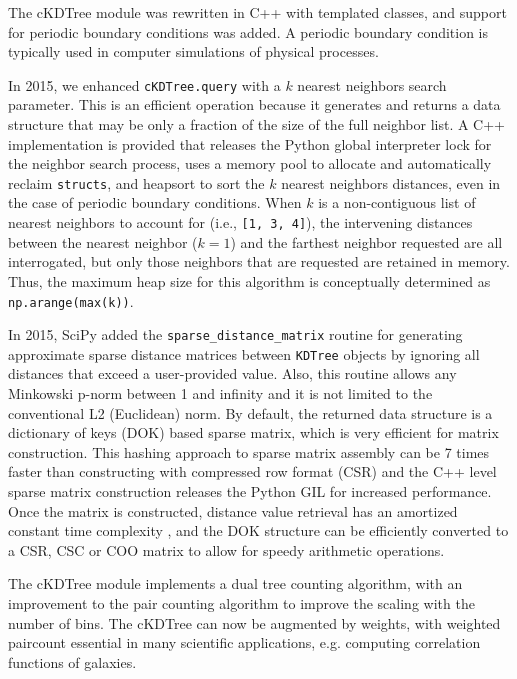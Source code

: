 The cKDTree module was rewritten in C++ with templated classes, and support for
periodic boundary conditions was added. A periodic boundary condition is typically 
used in computer simulations of physical processes.

In 2015, we enhanced \texttt{cKDTree.query} with a $k$ nearest neighbors search
parameter. This is an efficient operation\cite{Sproull:1991:RNS:3118219.3118331} 
because it generates and returns a data structure that may be only a fraction 
of the size of the full neighbor list. A C++ implementation is provided that releases
the Python global interpreter lock for the neighbor search process, uses
a memory pool to allocate and automatically reclaim \texttt{structs}, and
heapsort to sort the $k$ nearest neighbors distances, even in the case
of periodic boundary conditions. When $k$ is a non-contiguous list of nearest
neighbors to account for (i.e., \texttt{[1, 3, 4]}), the intervening distances
between the nearest neighbor ($k = 1$) and the farthest neighbor requested
are all interrogated, but only those neighbors that are requested are retained
in memory. Thus, the maximum heap size for this algorithm is conceptually determined
as \texttt{np.arange(max(k))}.

In 2015, SciPy added the \texttt{sparse_distance_matrix} routine for generating approximate 
sparse distance matrices between \texttt{KDTree} objects by ignoring all distances that 
exceed a user-provided value. Also, this routine allows any Minkowski p-norm between 1 and 
infinity and it is not limited to the conventional L2 (Euclidean) norm. 
By default, the returned data structure is a dictionary of keys (DOK) based sparse matrix, 
which is very efficient for matrix construction. 
This hashing approach to sparse matrix assembly can be 7 times faster than constructing 
with compressed row format (CSR) \cite{10.1007/978-3-540-75755-9_107} and the C++ level 
sparse matrix construction releases the Python GIL for increased performance. 
Once the matrix is constructed, distance value retrieval has an amortized constant time 
complexity \cite{Cormen:2001:IA:580470}, and the DOK structure can be efficiently converted 
to a CSR, CSC or COO matrix to allow for speedy arithmetic operations.

The cKDTree module implements a dual tree counting algorithm\cite{Moore2000ar},
with an improvement to the pair counting algorithm to improve the scaling
with the number of bins. The cKDTree can now be augmented by weights, with 
weighted paircount essential in many scientific applications, e.g. computing 
correlation functions of galaxies\cite{0004-637X-750-1-38}.

